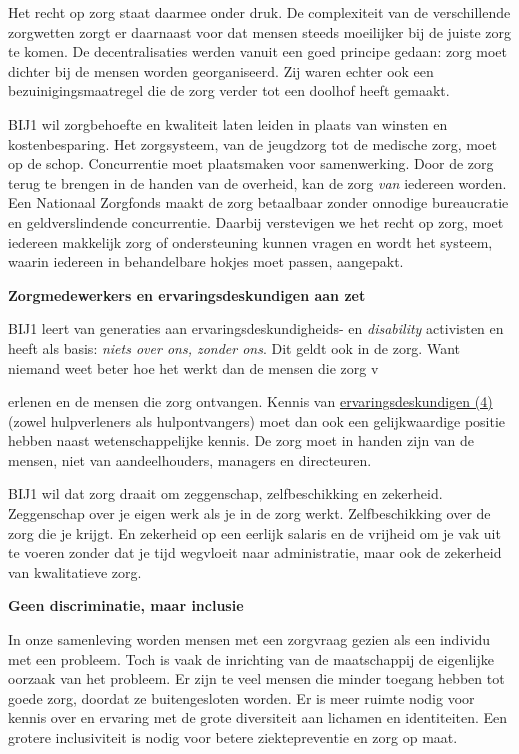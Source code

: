 Het recht op zorg staat daarmee onder druk. De complexiteit van de
verschillende zorgwetten zorgt er daarnaast voor dat mensen steeds
moeilijker bij de juiste zorg te komen. De decentralisaties werden
vanuit een goed principe gedaan: zorg moet dichter bij de mensen worden
georganiseerd. Zij waren echter ook een bezuinigingsmaatregel die de
zorg verder tot een doolhof heeft gemaakt.

BIJ1 wil zorgbehoefte en kwaliteit laten leiden in plaats van winsten en
kostenbesparing. Het zorgsysteem, van de jeugdzorg tot de medische zorg,
moet op de schop. Concurrentie moet plaatsmaken voor samenwerking. Door
de zorg terug te brengen in de handen van de overheid, kan de zorg
\emph{van} iedereen worden. Een Nationaal Zorgfonds maakt de zorg
betaalbaar zonder onnodige bureaucratie en geldverslindende
concurrentie. Daarbij verstevigen we het recht op zorg, moet iedereen
makkelijk zorg of ondersteuning kunnen vragen en wordt het systeem,
waarin iedereen in behandelbare hokjes moet passen, aangepakt.

\textbf{Zorgmedewerkers en ervaringsdeskundigen aan zet}

BIJ1 leert van generaties aan ervaringsdeskundigheids- en
\emph{disability} activisten en heeft als basis: \emph{niets over ons,
zonder ons}. Dit geldt ook in de zorg. Want niemand weet beter hoe het
werkt dan de mensen die zorg v

erlenen en de mensen die zorg ontvangen. Kennis van
\underline{ervaringsdeskundigen (4)} (zowel hulpverleners als
hulpontvangers) moet dan ook een gelijkwaardige positie hebben naast
wetenschappelijke kennis. De zorg moet in handen zijn van de mensen,
niet van aandeelhouders, managers en directeuren.

BIJ1 wil dat zorg draait om zeggenschap, zelfbeschikking en zekerheid.
Zeggenschap over je eigen werk als je in de zorg werkt. Zelfbeschikking
over de zorg die je krijgt. En zekerheid op een eerlijk salaris en de
vrijheid om je vak uit te voeren zonder dat je tijd wegvloeit naar
administratie, maar ook de zekerheid van kwalitatieve zorg.

\textbf{Geen discriminatie, maar inclusie}

In onze samenleving worden mensen met een zorgvraag gezien als een
individu met een probleem. Toch is vaak de inrichting van de
maatschappij de eigenlijke oorzaak van het probleem. Er zijn te veel
mensen die minder toegang hebben tot goede zorg, doordat ze
buitengesloten worden. Er is meer ruimte nodig voor kennis over en
ervaring met de grote diversiteit aan lichamen en identiteiten. Een
grotere inclusiviteit is nodig voor betere ziektepreventie en zorg op
maat.

